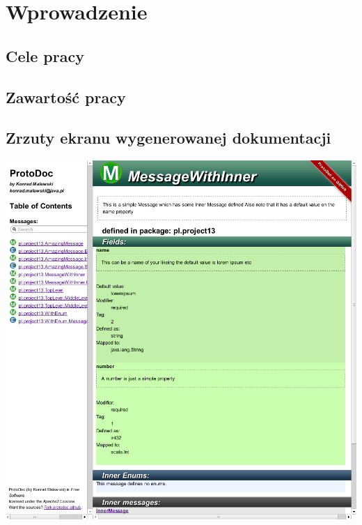 \chapter{Wprowadzenie}
\label{cha:wprowadzenie}

\section{Cele pracy}
\label{sec:celePracy}


\section{Zawartość pracy}
\label{sec:zawartoscPracy}

\section{Zrzuty ekranu wygenerowanej dokumentacji}
\label{sec:screenshots}

\begin{center}
 \includegraphics[width=\textwidth]{../protodoc_main.png}
\end{center}
